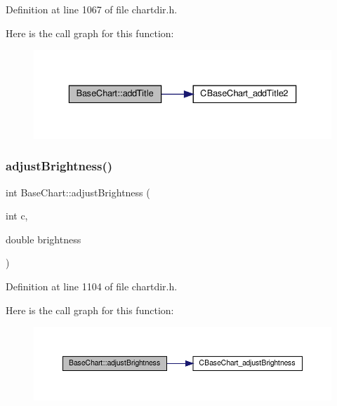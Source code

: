 Definition at line 1067 of file chartdir.\+h.

Here is the call graph for this function\+:
\nopagebreak
\begin{figure}[H]
\begin{center}
\leavevmode
\includegraphics[width=336pt]{class_base_chart_accd91106cbf8ca45cd8725b0ed2bb833_cgraph}
\end{center}
\end{figure}
\mbox{\label{class_base_chart_a8d0537753ea2dab3dacc9ae7f9c4d356}} 
\subsubsection{\texorpdfstring{adjust\+Brightness()}{adjustBrightness()}}
{\footnotesize\ttfamily int Base\+Chart\+::adjust\+Brightness (\begin{DoxyParamCaption}\item[{int}]{c,  }\item[{double}]{brightness }\end{DoxyParamCaption})\hspace{0.3cm}{\ttfamily [inline]}}



Definition at line 1104 of file chartdir.\+h.

Here is the call graph for this function\+:
\nopagebreak
\begin{figure}[H]
\begin{center}
\leavevmode
\includegraphics[width=350pt]{class_base_chart_a8d0537753ea2dab3dacc9ae7f9c4d356_cgraph}
\end{center}
\end{figure}
\mbox{\label{class_base_chart_af13e897adc780569cd048d997f7c59c6}} 
